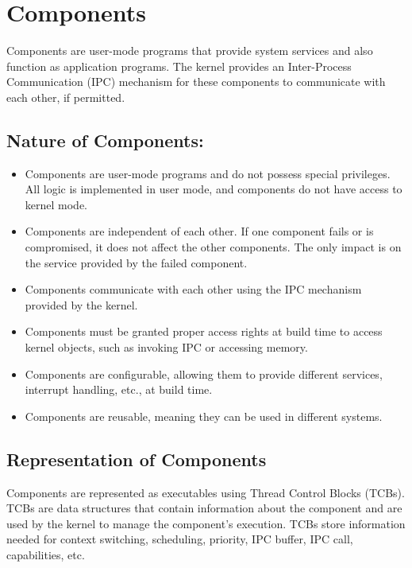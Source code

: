 \documentclass[
	a4paper, %
	11pt, %
	unnumberedsections, %
	twoside, %
]{LTJournalArticle}
\begin{document}
\section{Components}

Components are user-mode programs that provide system services and also function as application programs. The kernel provides an Inter-Process Communication (IPC) mechanism for these components to communicate with each other, if permitted.

\subsection{Nature of Components:}
\begin{itemize}
\item Components are user-mode programs and do not possess special privileges. All logic is implemented in user mode, and components do not have access to kernel mode.
\item Components are independent of each other. If one component fails or is compromised, it does not affect the other components. The only impact is on the service provided by the failed component.
\item Components communicate with each other using the IPC mechanism provided by the kernel.
\item Components must be granted proper access rights at build time to access kernel objects, such as invoking IPC or accessing memory.
\item Components are configurable, allowing them to provide different services, interrupt handling, etc., at build time.
\item Components are reusable, meaning they can be used in different systems.
\end{itemize}

\subsection{Representation of Components}
Components are represented as executables using Thread Control Blocks (TCBs). TCBs are data structures that contain information about the component and are used by the kernel to manage the component's execution. TCBs store information needed for context switching, scheduling, priority, IPC buffer, IPC call, capabilities, etc.
\end{document}
